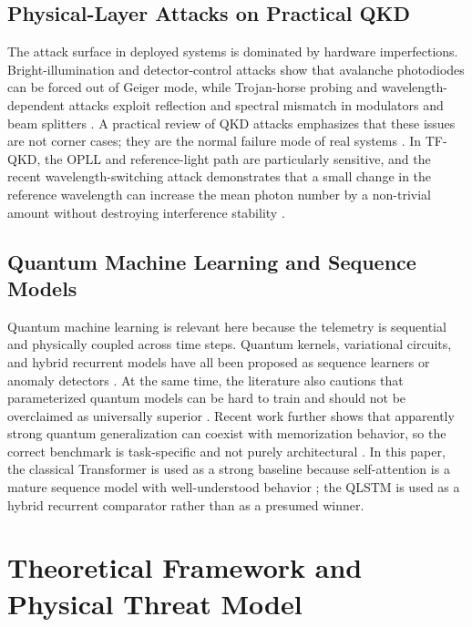 \subsection{Physical-Layer Attacks on Practical QKD}
The attack surface in deployed systems is dominated by hardware imperfections. Bright-illumination and detector-control attacks show that avalanche photodiodes can be forced out of Geiger mode, while Trojan-horse probing and wavelength-dependent attacks exploit reflection and spectral mismatch in modulators and beam splitters \cite{lydersen, makarov, gisin, li2011}. A practical review of QKD attacks emphasizes that these issues are not corner cases; they are the normal failure mode of real systems \cite{jain}. In TF-QKD, the OPLL and reference-light path are particularly sensitive, and the recent wavelength-switching attack demonstrates that a small change in the reference wavelength can increase the mean photon number by a non-trivial amount without destroying interference stability \cite{peng}.

\subsection{Quantum Machine Learning and Sequence Models}
Quantum machine learning is relevant here because the telemetry is sequential and physically coupled across time steps. Quantum kernels, variational circuits, and hybrid recurrent models have all been proposed as sequence learners or anomaly detectors \cite{rebentrost2014quantum, schuld2019quantum, havlicek2019supervised, qlstm, chen, mcclean2018barren, cerezo2021variational, bergholm2018pennylane, data_reuploading}. At the same time, the literature also cautions that parameterized quantum models can be hard to train and should not be overclaimed as universally superior \cite{mcclean2018barren, lu2020quantum, larocca2024review}. Recent work further shows that apparently strong quantum generalization can coexist with memorization behavior, so the correct benchmark is task-specific and not purely architectural \cite{gilfuster2024generalization, haug2024qfim}. In this paper, the classical Transformer is used as a strong baseline because self-attention is a mature sequence model with well-understood behavior \cite{vaswani2017attention}; the QLSTM is used as a hybrid recurrent comparator rather than as a presumed winner.


\section{Theoretical Framework and Physical Threat Model}

